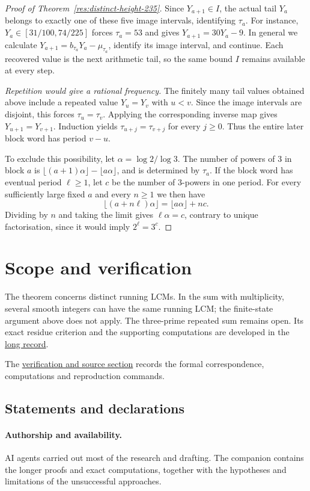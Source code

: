 \documentclass[11pt]{article}
\newcommand{\longrecord}[2]{\href{erdos269-running-lcm-reasoning-surface.pdf\##1}{#2}}
\begin{document}
\begin{proof}[Proof of Theorem~\ref{res:distinct-height-235}]
Since $Y_{a+1}\in I$, the actual tail $Y_a$ belongs to exactly one of
these five image intervals, identifying $\tau_a$. For instance,
$Y_a\in[31/100,74/225]$ forces $\tau_a=53$ and gives $Y_{a+1}=30Y_a-9$.
In general we calculate $Y_{a+1}=b_{\tau_a}Y_a-\mu_{\tau_a}$, identify its
image interval, and continue. Each recovered value is the next arithmetic
tail, so the same bound $I$ remains available at every step.

\medskip
\emph{Repetition would give a rational frequency.}
The finitely many tail values obtained above include a repeated value
$Y_u=Y_v$ with $u<v$. Since the image intervals are disjoint, this
forces $\tau_u=\tau_v$. Applying the corresponding inverse map gives
$Y_{u+1}=Y_{v+1}$. Induction yields
$\tau_{u+j}=\tau_{v+j}$ for every $j\ge0$. Thus the entire later block
word has period $v-u$.

To exclude this possibility, let $\alpha=\log2/\log3$. The number of powers
of $3$ in block $a$ is
$\lfloor(a+1)\alpha\rfloor-\lfloor a\alpha\rfloor$, and is determined by
$\tau_a$. If the block word has eventual period $\ell\ge1$, let $c$ be the
number of $3$-powers in one period. For every sufficiently large fixed $a$
and every $n\ge1$ we then have
\[
 \lfloor(a+n\ell)\alpha\rfloor=\lfloor a\alpha\rfloor+nc.
\]
Dividing by $n$ and taking the limit gives $\ell\alpha=c$, contrary to
unique factorisation, since it would imply $2^\ell=3^c$.
\end{proof}

\section*{Scope and verification}
The theorem concerns distinct running LCMs. In the sum with multiplicity,
several smooth integers can have the same running LCM; the finite-state
argument above does not apply. The three-prime repeated sum remains open.
Its exact residue criterion and the supporting computations are developed
in the \longrecord{r3-residue}{long record}.

\evidenceparagraph{\evidencerecordurl}
The \longrecord{scope-verification}{verification and source section}
records the formal correspondence, computations and reproduction commands.

\subsection*{Statements and declarations}
\paragraph{Authorship and availability.}
AI agents carried out most of the research and drafting. The companion
contains the longer proofs and exact computations, together with the
hypotheses and limitations of the unsuccessful approaches.
\end{document}
